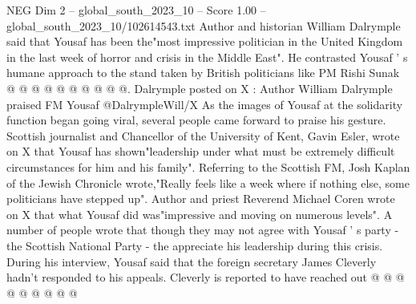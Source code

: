\begin{textsample}{NEG Dim 2 – global\_south\_2023\_10 – Score 1.00 – global\_south\_2023\_10/102614543.txt}
Author and historian William Dalrymple said that Yousaf has been the"most impressive politician in the United Kingdom in the last week of horror and crisis in the Middle East".
He contrasted Yousaf ' s humane approach to the stand taken by British politicians like PM Rishi Sunak @ @ @ @ @ @ @ @ @ @.
Dalrymple posted on X : Author William Dalrymple praised FM Yousaf @DalrympleWill/X As the images of Yousaf at the solidarity function began going viral, several people came forward to praise his gesture.
Scottish journalist and Chancellor of the University of Kent, Gavin Esler, wrote on X that Yousaf has shown"leadership under what must be extremely difficult circumstances for him and his family".
Referring to the Scottish FM, Josh Kaplan of the Jewish Chronicle wrote,"Really feels like a week where if nothing else, some politicians have stepped up".
Author and priest Reverend Michael Coren wrote on X that what Yousaf did was"impressive and moving on numerous levels".
A number of people wrote that though they may not agree with Yousaf ' s party - the Scottish National Party - the appreciate his leadership during this crisis.
During his interview, Yousaf said that the foreign secretary James Cleverly hadn't responded to his appeals.
Cleverly is reported to have reached out @ @ @ @ @ @ @ @ @

\end{textsample}
